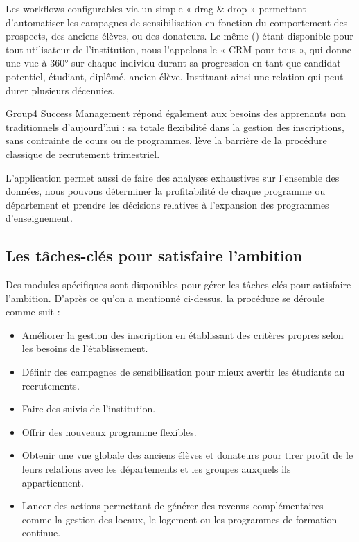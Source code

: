 Les workflows configurables via un simple « drag \& drop » permettant d'automatiser les campagnes de sensibilisation en fonction du comportement des prospects, des anciens élèves, ou des donateurs. Le même  () étant disponible pour tout utilisateur de l'institution, nous l'appelons le « CRM pour tous », qui donne une vue à 360° sur chaque individu durant sa progression en tant que candidat potentiel, étudiant, diplômé, ancien élève. Instituant ainsi une relation qui peut durer plusieurs décennies.
\medskip

Group4 Success Management répond également aux besoins des apprenants non traditionnels d'aujourd'hui : sa totale flexibilité dans la gestion des inscriptions, sans contrainte de cours ou de programmes, lève la barrière de la procédure classique de recrutement trimestriel.
\medskip

L'application permet aussi de faire des analyses exhaustives sur l'ensemble des données, nous pouvons déterminer la profitabilité de chaque programme ou département et prendre les décisions relatives à l'expansion des programmes d'enseignement.

\subsection{Les tâches-clés pour satisfaire l'ambition}
Des modules spécifiques sont disponibles pour gérer les tâches-clés pour satisfaire l'ambition. D'après ce qu'on a mentionné ci-dessus, la procédure se déroule comme suit : 

\begin{itemize}
	\item Améliorer la gestion des inscription en établissant des critères propres selon les besoins de l'établissement.
	\item Définir des campagnes de sensibilisation pour mieux avertir les étudiants au recrutements.
	\item Faire des suivis de l'institution.
	\item Offrir des nouveaux programme flexibles.
	\item Obtenir une vue globale des anciens élèves et donateurs pour tirer profit de le leurs relations avec les départements et les groupes auxquels ils appartiennent.
	\item Lancer des actions permettant de générer des revenus complémentaires comme la gestion des locaux, le logement ou les programmes de formation continue.
\end{itemize}

